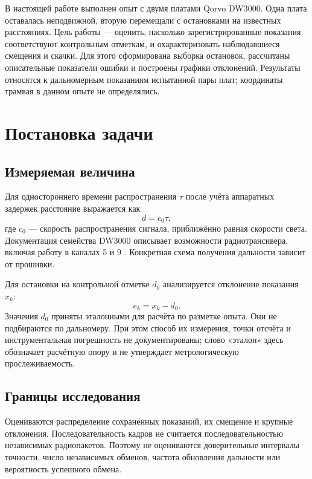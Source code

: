 \documentclass{misisarticle}
\begin{document}
В настоящей работе выполнен опыт с двумя платами Qorvo DW3000. Одна плата оставалась неподвижной, вторую перемещали с остановками на известных расстояниях. Цель работы --- оценить, насколько зарегистрированные показания соответствуют контрольным отметкам, и охарактеризовать наблюдавшиеся смещения и скачки. Для этого сформирована выборка остановок, рассчитаны описательные показатели ошибки и построены графики отклонений. Результаты относятся к дальномерным показаниям испытанной пары плат; координаты трамвая в данном опыте не определялись.

\section{Постановка задачи}

\subsection{Измеряемая величина}

Для одностороннего времени распространения $\tau$ после учёта аппаратных задержек расстояние выражается как
\begin{equation}
d=c_0\tau,
\end{equation}
где $c_0$ --- скорость распространения сигнала, приближённо равная скорости света. Документация семейства DW3000 описывает возможности радиотрансивера, включая работу в каналах 5 и 9 \cite{dw3000ds}. Конкретная схема получения дальности зависит от прошивки.

Для остановки на контрольной отметке $d_0$ анализируется отклонение показания $x_k$:
\begin{equation}
e_k=x_k-d_0.
\end{equation}
Значения $d_0$ приняты эталонными для расчёта по разметке опыта. Они не подбираются по дальномеру. При этом способ их измерения, точки отсчёта и инструментальная погрешность не документированы; слово «эталон» здесь обозначает расчётную опору и не утверждает метрологическую прослеживаемость.

\subsection{Границы исследования}

Оцениваются распределение сохранённых показаний, их смещение и крупные отклонения. Последовательность кадров не считается последовательностью независимых радиопакетов. Поэтому не оцениваются доверительные интервалы точности, число независимых обменов, частота обновления дальности или вероятность успешного обмена.
\end{document}
